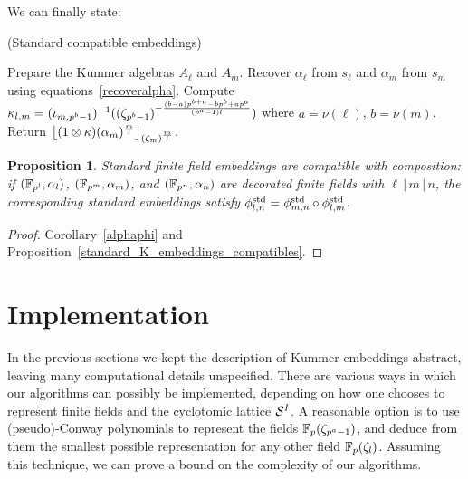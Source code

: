 \documentclass[sigconf]{acmart}
\newtheorem{proposition}[theorem]{Proposition}
\begin{document}
We can finally state:
\begin{algorithm}
  \caption{(Standard compatible embeddings)}
  \label{algo:std_embed}
  \begin{algorithmic}[1]
  \STATE Prepare the Kummer algebras $A_\ell$ and $A_m$.
  \STATE Recover $\alpha_\ell$ from $s_\ell$ and $\alpha_m$ from $s_m$ using equations~\eqref{recoveralpha}.%
  \STATE Compute $\kappa_{l,m}=({\iota_{{m},{p^b-1}}})^{-1}((\zeta_{p^b-1})^{-\frac{(b-a)p^{b+a}-bp^b+ap^a}{(p^a-1)l}})$ where $a=\nu(\ell)$, $b=\nu(m)$.
  \STATE Return $\left\lfloor (1\otimes\kappa)(\alpha_m)^{\frac{m}{l}} \right\rfloor_{(\zeta_m)^{\frac{m}{l}}}$.
  \end{algorithmic}
\end{algorithm}
\begin{proposition}
\label{standard_ff_embeddings_compatibles}
Standard finite field embeddings are compatible with composition:
if $(\mathbb{F}_{p^l},\alpha_l)$, $(\mathbb{F}_{p^m},\alpha_m)$, and $(\mathbb{F}_{p^n},\alpha_n)$ are decorated finite fields
with $\ell\,|\,m\,|\,n$, the corresponding standard embeddings
satisfy ${\phi^{\mathrm{std}}_{{l},{n}}}={\phi^{\mathrm{std}}_{{m},{n}}}\circ{\phi^{\mathrm{std}}_{{l},{m}}}$.
\end{proposition}
\begin{proof}
Corollary~\ref{alphaphi} and Proposition~\ref{standard_K_embeddings_compatibles}.
\end{proof}

\section{Implementation}
\label{sec:implementation}

In the previous sections we kept the description of Kummer embeddings
abstract, leaving many computational details unspecified. %
There are various ways in which our algorithms can possibly be
implemented, depending on how one chooses to represent finite fields
and the cyclotomic lattice $\mathcal{S}^{I}$. %
A reasonable option is to use (pseudo)-Conway polynomials to represent
the fields $\mathbb{F}_p(\zeta_{p^a-1})$, and deduce from them the smallest
possible representation for any other field $\mathbb{F}_p(\zeta_l)$. %
Assuming this technique, we can prove a bound on the complexity of our
algorithms.
\end{document}

